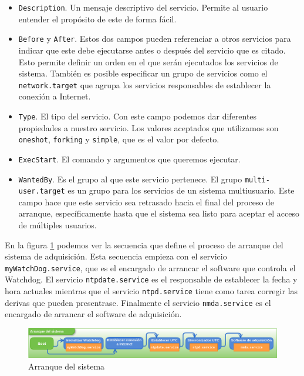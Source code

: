 	\begin{itemize}
		\item	\texttt{Description}. Un mensaje descriptivo del servicio. Permite al usuario entender el propósito de este de forma fácil.
		\item	\texttt{Before} y \texttt{After}. Estos dos campos pueden referenciar a otros servicios para indicar que este debe ejecutarse
			antes o después del servicio que es citado. Esto permite definir un orden en el que serán ejecutados los servicios de sistema.
			También es posible especificar un grupo de servicios como el \texttt{network.target} que agrupa los servicios responsables de
			establecer la conexión a Internet. 
		\item	\texttt{Type}. El tipo del servicio. Con este campo podemos dar diferentes propiedades a nuestro servicio. Los valores
			aceptados que utilizamos son \texttt{oneshot}, \texttt{forking} y \texttt{simple}, que es el valor por defecto.
		\item	\texttt{ExecStart}. El comando y argumentos que queremos ejecutar.
		\item	\texttt{WantedBy}. Es el grupo al que este servicio pertenece. El grupo \texttt{multi-user.target} es un grupo para los
			servicios de un sistema multiusuario. Este campo hace que este servicio sea retrasado hacia el final del proceso de arranque,
			específicamente hasta que el sistema sea listo para aceptar el acceso de múltiples usuarios. 
	\end{itemize}
	\par
	En la figura \ref{fig:boot} podemos ver la secuencia que define el proceso de arranque del sistema de adquisición. Esta secuencia empieza con
	el servicio \texttt{myWatchDog.service}, que es el encargado de arrancar el software que controla el Watchdog. El servicio
	\texttt{ntpdate.service} es el responsable de establecer la fecha y hora actuales mientras que el servicio \texttt{ntpd.service} tiene como
	tarea corregir las derivas que pueden presentrase. Finalmente el servicio \texttt{nmda.service} es el encargado de arrancar el software de
	adquisición.
	\begin{figure}[h]
		\centering
		\includegraphics[keepaspectratio, width=1\textwidth]{./img/boot.png}
		\caption{Arranque del sistema}   
		\label{fig:boot}
	\end{figure}
